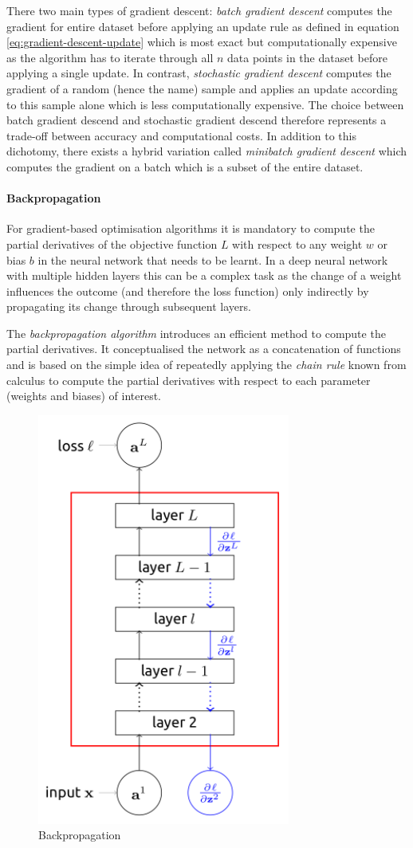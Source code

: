 There two main types of gradient descent: \emph{batch gradient descent} computes the gradient for entire dataset before applying an update rule as defined in equation \ref{eq:gradient-descent-update} which is most exact but computationally expensive as the algorithm has to iterate through all $n$ data points in the dataset before applying a single update. In contrast, \emph{stochastic gradient descent} computes the gradient of a random (hence the name) sample and applies an update according to this sample alone which is less computationally expensive. The choice between batch gradient descend and stochastic gradient descend therefore represents a trade-off between accuracy and computational costs. In addition to this dichotomy, there exists a hybrid variation called \emph{minibatch gradient descent} which computes the gradient on a batch which is a subset of the entire dataset. 

\paragraph{Backpropagation} For gradient-based optimisation algorithms it is mandatory to compute the partial derivatives of the objective function $L$ with respect to any weight $w$ or bias $b$ in the neural network that needs to be learnt. In a deep neural network with multiple hidden layers this can be a complex task as the change of a weight influences the outcome (and therefore the loss function) only indirectly by propagating its change through subsequent layers. 

The \emph{backpropagation algorithm} \cite{backprop1} introduces an efficient method to compute the partial derivatives. It conceptualised the network as a concatenation of functions and is based on the simple idea of repeatedly applying the \emph{chain rule} known from calculus to compute the partial derivatives with respect to each parameter (weights and biases) of interest. 

\begin{figure}[h]
	\centering
	\includegraphics[height=0.5\textwidth]{figures/chapter-2/backpropagation.png}
	\caption{Backpropagation}\label{fig:backpropagation}   
\end{figure}


